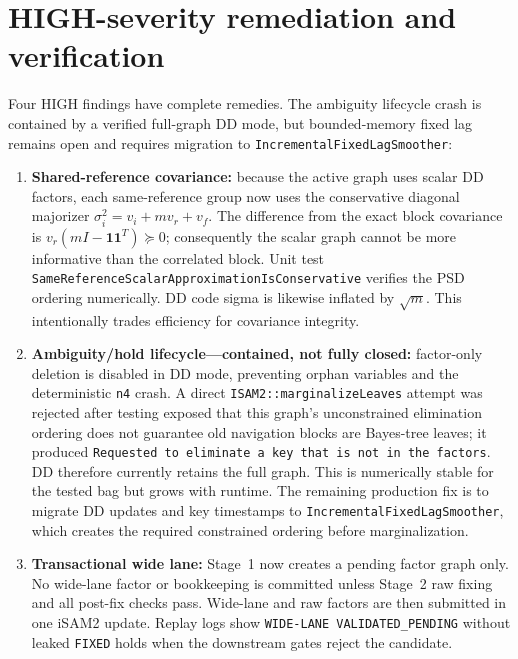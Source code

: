 \documentclass[11pt,a4paper]{article}
\newcommand{\code}[1]{\texttt{#1}}
\begin{document}
\section{HIGH-severity remediation and verification}
\label{sec:high-remediation}

Four HIGH findings have complete remedies.  The ambiguity lifecycle crash is
contained by a verified full-graph DD mode, but bounded-memory fixed lag remains
open and requires migration to \code{IncrementalFixedLagSmoother}:
\begin{enumerate}
  \item \textbf{Shared-reference covariance:} because the active graph uses
  scalar DD factors, each same-reference group now uses the conservative
  diagonal majorizer
  $\sigma_i^2=v_i+m v_r+v_f$.  The difference from the exact block covariance
  is $v_r(mI-\mathbf{1}\mathbf{1}^T)\succeq0$; consequently the scalar graph
  cannot be more informative than the correlated block.  Unit test
  \code{SameReferenceScalarApproximationIsConservative} verifies the PSD
  ordering numerically.  DD code sigma is likewise inflated by $\sqrt m$.
  This intentionally trades efficiency for covariance integrity.

  \item \textbf{Ambiguity/hold lifecycle---contained, not fully closed:}
  factor-only deletion is disabled in DD mode, preventing orphan variables and
  the deterministic \code{n4} crash.  A direct
  \code{ISAM2::marginalizeLeaves} attempt was rejected after testing exposed
  that this graph's unconstrained elimination ordering does not guarantee old
  navigation blocks are Bayes-tree leaves; it produced
  \code{Requested to eliminate a key that is not in the factors}.  DD therefore
  currently retains the full graph.  This is numerically stable for the tested
  bag but grows with runtime.  The remaining production fix is to migrate DD
  updates and key timestamps to \code{IncrementalFixedLagSmoother}, which
  creates the required constrained ordering before marginalization.

  \item \textbf{Transactional wide lane:} Stage~1 now creates a pending factor
  graph only.  No wide-lane factor or bookkeeping is committed unless Stage~2
  raw fixing and all post-fix checks pass.  Wide-lane and raw factors are then
  submitted in one iSAM2 update.  Replay logs show
  \code{WIDE-LANE VALIDATED\_PENDING} without leaked \code{FIXED} holds when the
  downstream gates reject the candidate.


\end{enumerate}
\end{document}
